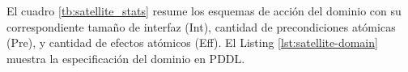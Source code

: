 El cuadro \ref{tb:satellite_stats} resume los esquemas de acción del dominio con
su correspondiente tamaño de interfaz (Int), cantidad de precondiciones atómicas
(Pre), y cantidad de efectos atómicos (Eff). El Listing
\ref{lst:satellite-domain} muestra la especificación del dominio en PDDL.

\begin{table}[h!]
    \centering
    \caption{Cantidad de argumentos, precondiciones, y efectos por esquema de acción.}
    \label{tb:satellite_stats}
\end{table}


